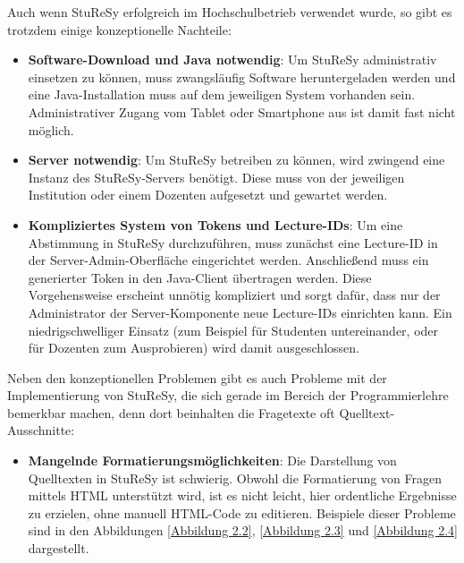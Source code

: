 Auch wenn StuReSy erfolgreich im Hochschulbetrieb verwendet wurde, so gibt es trotzdem einige konzeptionelle Nachteile:
\begin{itemize}
    \item \textbf{Software-Download und Java notwendig}: Um StuReSy administrativ einsetzen zu können, muss zwangsläufig Software heruntergeladen werden und eine Java-Installation muss auf dem jeweiligen System vorhanden sein. Administrativer Zugang vom Tablet oder Smartphone aus ist damit fast nicht möglich.
    \item \textbf{Server notwendig}: Um StuReSy betreiben zu können, wird zwingend eine Instanz des StuReSy-Servers benötigt. Diese muss von der jeweiligen Institution oder einem Dozenten aufgesetzt und gewartet werden.
    \item \textbf{Kompliziertes System von Tokens und Lecture-IDs}: Um eine Abstimmung in StuReSy durchzuführen, muss zunächst eine Lecture-ID in der Server-Admin-Oberfläche eingerichtet werden. Anschließend muss ein generierter Token in den Java-Client übertragen werden. Diese Vorgehensweise erscheint unnötig kompliziert und sorgt dafür, dass nur der Administrator der Server-Komponente neue Lecture-IDs einrichten kann. Ein niedrigschwelliger Einsatz (zum Beispiel für Studenten untereinander, oder für Dozenten zum Ausprobieren) wird damit ausgeschlossen.
\end{itemize}

Neben den konzeptionellen Problemen gibt es auch Probleme mit der Implementierung von StuReSy, die sich gerade im Bereich der Programmierlehre bemerkbar machen, denn dort beinhalten die Fragetexte oft Quelltext-Ausschnitte:
\begin{itemize}
\item \textbf{Mangelnde Formatierungsmöglichkeiten}: Die Darstellung von Quelltexten in StuReSy ist schwierig. Obwohl die Formatierung von Fragen mittels HTML unterstützt wird, ist es nicht leicht, hier ordentliche Ergebnisse zu erzielen, ohne manuell HTML-Code zu editieren. Beispiele dieser Probleme sind in den Abbildungen \ref{Abbildung 2.2}, \ref{Abbildung 2.3} und \ref{Abbildung 2.4} dargestellt.
\end{itemize}

